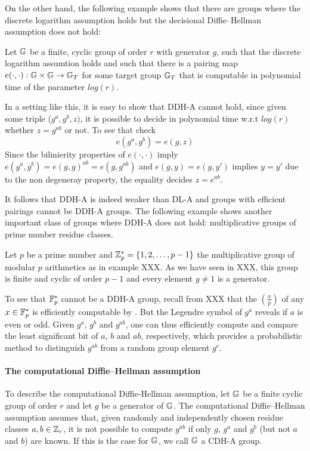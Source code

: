 On the other hand, the following example shows that there are groups where the discrete logarithm assumption holds but the decisional  Diffie--Hellman assumption does not hold:
\begin{example} Let $\mathbb{G}$ be a finite, cyclic group of order $r$ with generator $g$, such that the discrete logarithm assumtion holds and such that there is a pairing map $e(\cdot,\cdot): \mathbb{G} \times \mathbb{G} \to \mathbb{G}_T$ for some target group $\mathbb{G}_T$ that is computable in polynomial time of the parameter $log(r)$. 

In a setting like this, it is easy to show that DDH-A cannot hold, since given some  triple ($ g^a , g^b , z )$, it is possible to decide in polynomial time w.r.t $log(r)$ whether $z=g^{ab}$ or not. To see that check 
$$
e(g^a,g^b)=e(g,z)
$$Since the bilinierity properties of $e(\cdot,\cdot)$ imply $e(g^a,g^b)= e(g,g)^{ab}= e(g,g^{ab})$ and $e(g,y)=e(g,y')$ implies $y=y'$ due to the non degeneray property, the equality decides $z=e^{ab}$.
\end{example} 
It follows that DDH-A is indeed weaker than DL-A and groups with efficient pairings cannot be DDH-A groups. The following example shows another important class of groups where DDH-A does not hold: multiplicative groups of prime number residue classes.
\begin{example}Let $p$ be a prime number and $\mathbb{Z}_p^*=\{1,2,\ldots,p-1\}$ the multiplicative group of modular $p$ arithmetics as in example XXX. As we have seen in XXX, this group is finite and cyclic of order $p-1$ and every element $g\neq 1$ is a generator.

To see that $\mathbb{F}_p^*$ cannot be a DDH-A group, recall from XXX that the  $\left(\frac{x}{p}\right)$ of any $x\in \mathbb{F}_p^*$ is efficiently computable by . But the  Legendre symbol of $g^{a}$ reveals if $a$ is even or odd. Given $g^{a}$, $g^{b}$ and $g^{ab}$, one can thus efficiently compute and compare the least significant bit of $a$, $b$ and $a b$, respectively, which provides a probabilistic method to distinguish $g^{ab}$ from a random group element $g^c$. 
\end{example}
\paragraph{The computational  Diffie--Hellman assumption}
To describe the computational Diffie-Hellman assumption, let $\mathbb{G}$ be a finite cyclic group of order $r$ and let $g$ be a generator of $\mathbb{G}$. The computational Diffie--Hellman assumption assumes that, given randomly and independently  chosen residue classes $a,b\in\mathbb{Z}_r$, it is not possible to compute $g^{ab}$ if only $g$, $g^a$ and $g^b$ (but not $a$ and $b$) are known. If this is the case for $\mathbb{G}$, we call $\mathbb{G}$ a CDH-A group.


